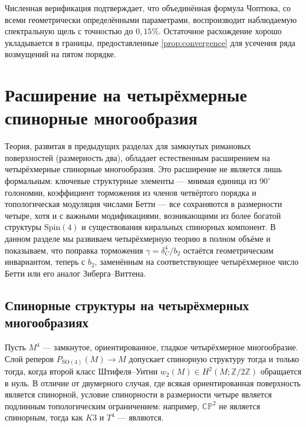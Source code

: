 \documentclass[12pt,a4paper]{article}
\theoremstyle{definition}
\theoremstyle{remark}
\newcommand{\CC}{\mathbb{C}}
\newcommand{\ZZ}{\mathbb{Z}}
\newcommand{\PP}{\mathbb{P}}
\newcommand{\SO}{\mathrm{SO}}
\newcommand{\Spin}{\mathrm{Spin}}
\begin{document}
Численная верификация подтверждает, что объединённая формула Чоптюка, со всеми геометрически определёнными параметрами, воспроизводит наблюдаемую спектральную щель с точностью до $0{,}15\%$. Остаточное расхождение хорошо укладывается в границы, предоставленные \cref{prop:convergence} для усечения ряда возмущений на пятом порядке.


\section{Расширение на четырёхмерные спинорные многообразия}
\label{sec:4d}

Теория, развитая в предыдущих разделах для замкнутых римановых поверхностей (размерность два), обладает естественным расширением на четырёхмерные спинорные многообразия. Это расширение не является лишь формальным: ключевые структурные элементы --- мнимая единица из $90^\circ$ голономии, коэффициент торможения из членов четвёртого порядка и топологическая модуляция числами Бетти --- все сохраняются в размерности четыре, хотя и с важными модификациями, возникающими из более богатой структуры $\Spin(4)$ и существования киральных спинорных компонент. В данном разделе мы развиваем четырёхмерную теорию в полном объёме и показываем, что поправка торможения $\gamma = \delta_C^4/b_2$ остаётся геометрическим инвариантом, теперь с $b_2$, заменённым на соответствующее четырёхмерное число Бетти или его аналог Зиберга--Виттена.

\subsection{Спинорные структуры на четырёхмерных многообразиях}

Пусть $M^4$ --- замкнутое, ориентированное, гладкое четырёхмерное многообразие. Слой реперов $P_{\SO(4)}(M) \to M$ допускает спинорную структуру тогда и только тогда, когда второй класс Штифеля--Уитни $w_2(M) \in H^2(M; \ZZ/2\ZZ)$ обращается в нуль. В отличие от двумерного случая, где всякая ориентированная поверхность является спинорной, условие спинорности в размерности четыре является подлинным топологическим ограничением: например, $\CC\PP^2$ не является спинорным, тогда как $K3$ и $T^4$ --- являются.
\end{document}
